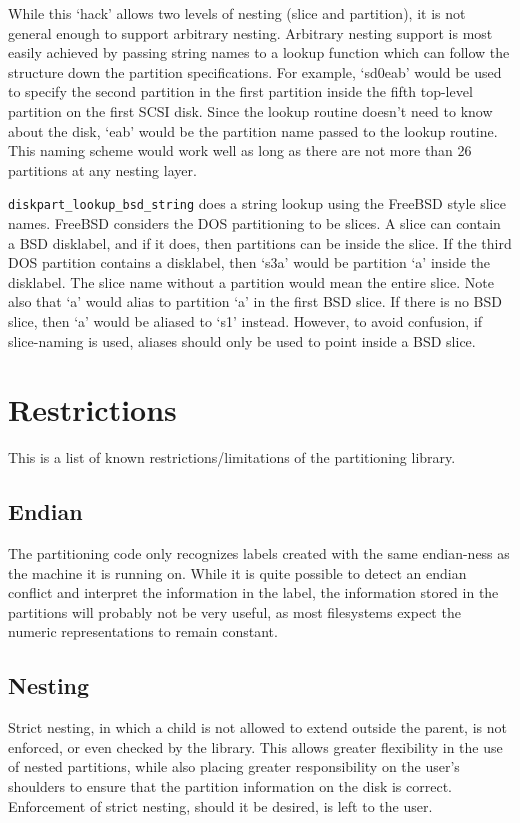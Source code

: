 While this `hack' allows two levels of nesting (slice and partition),
it is not general enough to support arbitrary nesting.  Arbitrary
nesting support is most easily achieved by passing string names to a
lookup function which can follow the structure down the partition
specifications.  For example, `sd0eab' would be used to specify the
second partition in the first partition inside the fifth top-level
partition on the first SCSI disk.  Since the lookup routine doesn't
need to know about the disk, `eab' would be the partition name passed
to the lookup routine.  This naming scheme would work well as long as
there are not more than 26 partitions at any nesting layer.

{\tt diskpart_lookup_bsd_string} does a string lookup using the
FreeBSD style slice names.  FreeBSD considers the DOS partitioning to
be slices.  A slice can contain a BSD disklabel, and if it does, then
partitions can be inside the slice.  If the third DOS partition
contains a disklabel, then `s3a' would be partition `a' inside the
disklabel.  The slice name without a partition would mean the entire
slice.  Note also that `a' would alias to partition `a' in the first
BSD slice.  If there is no BSD slice, then `a' would be aliased to
`s1' instead.  However, to avoid confusion, if slice-naming is used, 
aliases should only be used to point inside a BSD slice.

\section{Restrictions}

This is a list of known restrictions/limitations of the partitioning library.

\subsection{Endian}
The partitioning code only recognizes labels
created with the same endian-ness as the machine it is running on.
While it is quite possible to detect an endian conflict and interpret the 
information in the label, the information stored in the partitions will 
probably not be very useful, as most filesystems expect the numeric 
representations to remain constant.

\subsection{Nesting}
Strict nesting, in which a child is not allowed to extend outside the parent, 
is not enforced, or even checked by the library.  This allows greater 
flexibility in the use of nested partitions, while also placing greater 
responsibility on the user's shoulders to ensure that the partition 
information on the disk is correct.  Enforcement of strict nesting, 
should it be desired, is left to the user.

